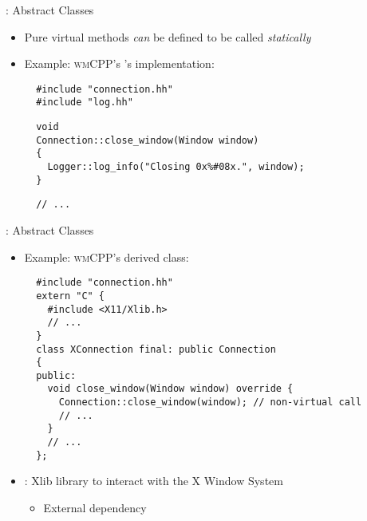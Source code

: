 \begin{frame}[fragile]{\underline{\cpp}: Abstract Classes \hfill {\footnotesize \currentname}}


    \begin{itemize}

        \item Pure virtual methods \textit{can} be defined to be called \textit{statically}

        \item Example: \textsc{wmCPP}'s 's implementation:\\[3pt]
\begin{verbatim}
  #include "connection.hh"
  #include "log.hh"
\end{verbatim}
\begin{verbatim}
  void
  Connection::close_window(Window window)
  {
    Logger::log_info("Closing 0x%#08x.", window);
  }
\end{verbatim}
\begin{verbatim}
  // ...
\end{verbatim}

    \end{itemize}

    \vfill

\end{frame}

\begin{frame}[c,fragile]{\underline{\cpp}: Abstract Classes \hfill {\footnotesize \currentname}}


    \vspace*{-5pt}\begin{itemize}

        \item Example: \textsc{wmCPP}'s  derived class:\\
\begin{verbatim}
  #include "connection.hh"
  extern "C" {
    #include <X11/Xlib.h>
    // ...
  }
  class XConnection final: public Connection
  {
  public:
    void close_window(Window window) override {
      Connection::close_window(window); // non-virtual call
      // ...
    }
    // ...
  };
\end{verbatim}

        \item {}: Xlib library to interact with the X Window System\\
            \begin{itemize}
                \item External dependency
            \end{itemize}


    \end{itemize}

    \vfill

\end{frame}

